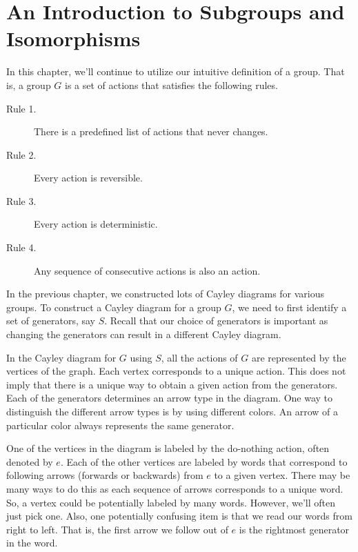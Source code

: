 \chapter{An Introduction to Subgroups and Isomorphisms}
\label{chapter:intro_subgroups_isomorphisms}
\thispagestyle{empty}

In this chapter, we'll continue to utilize our intuitive definition of a group.  That is, a group \(G\) is a set of actions that satisfies the following rules.

\begin{description}
\item[Rule 1.] There is a predefined list of actions that never changes.
\item[Rule 2.] Every action is reversible.
\item[Rule 3.] Every action is deterministic.
\item[Rule 4.] Any sequence of consecutive actions is also an action.
\end{description}

In the previous chapter, we constructed lots of Cayley diagrams for various groups.  To construct a Cayley diagram for a group \(G\), we need to first identify a set of generators, say \(S\).  Recall that our choice of generators is important as changing the generators can result in a different Cayley diagram.  

In the Cayley diagram for \(G\) using \(S\), all the actions of \(G\) are represented by the vertices of the graph.  Each vertex corresponds to a unique action.  This does not imply that there is a unique way to obtain a given action from the generators.  Each of the generators determines an arrow type in the diagram.  One way to distinguish the different arrow types is by using different colors.  An arrow of a particular color always represents the same generator.

One of the vertices in the diagram is labeled by the do-nothing action, often denoted by \(e\).  Each of the other vertices are labeled by words that correspond to following arrows (forwards or backwards) from \(e\) to a given vertex.  There may be many ways to do this as each sequence of arrows corresponds to a unique word.  So, a vertex could be potentially labeled by many words.  However, we'll often just pick one.  Also, one potentially confusing item is that we read our words from right to left.  That is, the first arrow we follow out of \(e\) is the rightmost generator in the word.

